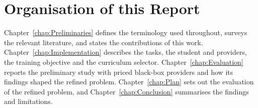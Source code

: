 \section{Organisation of this Report}
\label{sec:Organisation}

Chapter~\ref{chap:Preliminaries} defines the terminology used throughout, surveys the
relevant literature, and states the contributions of this work.
Chapter~\ref{chap:Implementation} describes the tasks, the student and providers, the
training objective and the curriculum selector. Chapter~\ref{chap:Evaluation} reports
the preliminary study with priced black-box providers and how its findings shaped the
refined problem. Chapter~\ref{chap:Plan} sets out the evaluation of the refined
problem, and Chapter~\ref{chap:Conclusion} summarises the findings and limitations.
